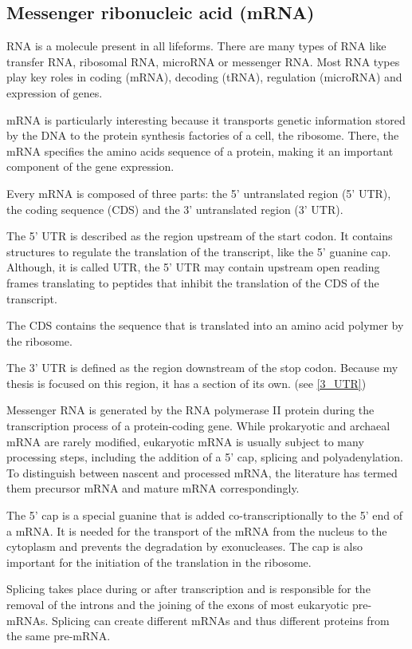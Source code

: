 \subsection{Messenger ribonucleic acid (mRNA)}
\label{mrna}
RNA is a molecule present in all lifeforms. There are many types of RNA like transfer RNA, ribosomal RNA, microRNA or messenger RNA. Most RNA types play key roles in coding (mRNA), decoding (tRNA), regulation (microRNA) and expression of genes.

mRNA is particularly interesting because it transports genetic information stored by the DNA to the protein synthesis factories of a cell, the ribosome. There, the mRNA specifies the amino acids sequence of a protein, making it an important component of the gene expression.

Every mRNA is composed of three parts: the 5' untranslated region (5' UTR), the coding sequence (CDS) and the 3' untranslated region (3' UTR).  

The 5' UTR is described as the region upstream of the start codon. It contains structures to regulate the translation of the transcript, like the 5' guanine cap. Although, it is called UTR, the 5' UTR may contain upstream open reading frames translating to peptides that inhibit the translation of the CDS of the transcript.

The CDS contains the sequence that is translated into an amino acid polymer by the ribosome.

The 3' UTR is defined as the region downstream of the stop codon. Because my thesis is focused on this region, it has a section of its own. (see \ref{3_UTR})

Messenger RNA is generated by the RNA polymerase II protein during the transcription process of a protein-coding gene. While prokaryotic and archaeal mRNA are rarely modified, eukaryotic mRNA is usually subject to many processing steps, including the addition of a 5' cap, splicing and polyadenylation. To distinguish between nascent and processed mRNA, the literature has termed them precursor mRNA and mature mRNA correspondingly.

The 5' cap is a special guanine that is added co-transcriptionally to the 5' end of a mRNA. It is needed for the transport of the mRNA from the nucleus to the cytoplasm and prevents the degradation by exonucleases. The cap is also important for the initiation of the translation in the ribosome. 

Splicing takes place during or after transcription and is responsible for the removal of the introns and the joining of the exons of most eukaryotic pre-mRNAs. Splicing can create different mRNAs and thus different proteins from the same pre-mRNA. 

